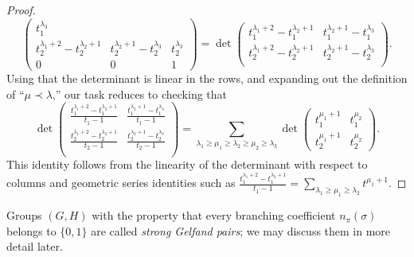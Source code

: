 \documentclass[reqno]{amsart} 
\begin{document}
\begin{proof}
\begin{equation}
\begin{pmatrix}
      t_1^{\lambda_3} \\
      t_2^{\lambda_1 + 2} -
      t_2^{\lambda_2 + 1} &
      t_2^{\lambda_2 + 1} - t_2^{\lambda_3}  &
      t_2^{\lambda_3} \\
      0 & 0 & 1      
    \end{pmatrix}
    =
    \det 
\begin{pmatrix}
      t_1^{\lambda_1 + 2} - t_1^{\lambda_2 + 1}
      & t_1^{\lambda_2 + 1} - t_1^{\lambda_3} \\
      t_2^{\lambda_1 + 2} -
      t_2^{\lambda_2 + 1} & t_2^{\lambda_2
        + 1} - t_2^{\lambda_3}      \\
    \end{pmatrix}
.
  \end{equation}
  Using that the determinant is linear in the rows, and expanding out the definition of ``$\mu \prec \lambda$,'' our task reduces to checking that
  \begin{equation}\label{eq:}
    \det 
\begin{pmatrix}
      \frac{t_1^{\lambda_1 + 2} - t_1^{\lambda_2 + 1}}{t_1 - 1}
      & \frac{t_1^{\lambda_2 + 1} - t_1^{\lambda_3}}{t_1-1} \\
      \frac{t_2^{\lambda_1 + 2} -
        t_2^{\lambda_2 + 1}}{t_2-1} &
      \frac{t_2^{\lambda_2
          + 1} - t_2^{\lambda_3}}{t_2-1}      \\
    \end{pmatrix}
    =
    \sum_{\lambda_1 \geq \mu_1 \geq \lambda_2 \geq \mu_2 \geq \lambda_3}
    \det
    \begin{pmatrix}
      t_1^{\mu_1 + 1} & t_1^{\mu_2} \\
      t_2^{\mu_1 + 1} & t_2^{\mu_2}
    \end{pmatrix}
.
  \end{equation}
  This identity follows from the linearity of the determinant with respect to columns and geometric series identities such as $\frac{t_1^{\lambda_1 + 2} - t_1^{\lambda_2 + 1}}{t_1 - 1} = \sum_{\lambda_1 \geq \mu_1 \geq \lambda_2} t^{\mu_1 + 1}$.
\end{proof}

Groups $(G,H)$ with the property that every branching coefficient $n_\pi(\sigma)$ belongs to $\{0,1\}$ are called \emph{strong Gelfand pairs}; we may discuss them in more detail later.
\end{document}
